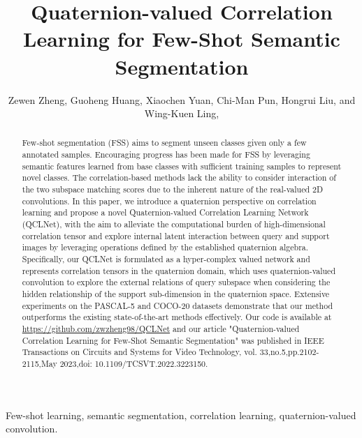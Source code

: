 \documentclass[lettersize,journal]{IEEEtran}
\begin{document}
\title{Quaternion-valued Correlation Learning for Few-Shot Semantic Segmentation}

\author{Zewen Zheng,
Guoheng Huang,
Xiaochen Yuan,
Chi-Man Pun,
Hongrui Liu,
and Wing-Kuen Ling,
}



\maketitle

\begin{abstract}
Few-shot segmentation (FSS) aims to segment unseen classes given only a few annotated samples. Encouraging progress has been made for FSS by leveraging semantic features learned from base classes with sufficient training samples to represent novel classes. The correlation-based methods lack the ability to consider interaction of the two subspace matching scores due to the inherent nature of the real-valued 2D convolutions. In this paper, we introduce a quaternion perspective on correlation learning and propose a novel Quaternion-valued Correlation Learning Network (QCLNet), with the aim to alleviate the computational burden of high-dimensional correlation tensor and explore internal latent interaction between query and support images by leveraging operations defined by the established quaternion algebra. Specifically, our QCLNet is formulated as a hyper-complex valued network and represents correlation tensors in the quaternion domain, which uses quaternion-valued convolution to explore the external relations of query subspace when considering the hidden relationship of the support sub-dimension in the quaternion space. Extensive experiments on the PASCAL-5 and COCO-20 datasets demonstrate that our method outperforms the existing state-of-the-art methods effectively. Our code is available at \url{https://github.com/zwzheng98/QCLNet} and our article "Quaternion-valued Correlation Learning for Few-Shot Semantic Segmentation" was published in IEEE Transactions on Circuits and Systems for Video Technology, vol. 33,no.5,pp.2102-2115,May 2023,doi: 10.1109/TCSVT.2022.3223150.


\end{abstract}

\begin{IEEEkeywords}
Few-shot learning, semantic segmentation, correlation learning, quaternion-valued convolution.
\end{IEEEkeywords}
\end{document}

